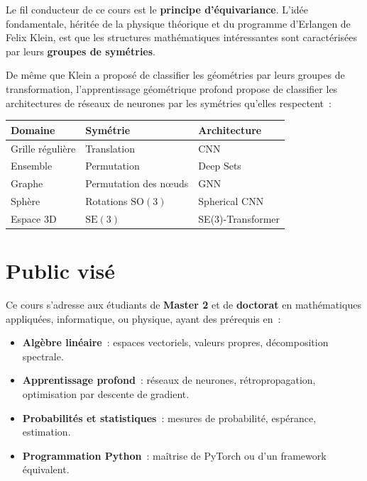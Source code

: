 Le fil conducteur de ce cours est le \textbf{principe d'\'equivariance}. L'id\'ee
fondamentale, h\'erit\'ee de la physique th\'eorique et du programme d'Erlangen de
Felix Klein, est que les structures math\'ematiques int\'eressantes sont caract\'eris\'ees
par leurs \textbf{groupes de sym\'etries}.

\begin{intuition}[title=\textbf{Le programme d'Erlangen pour le deep learning}]
De m\^eme que Klein a propos\'e de classifier les g\'eom\'etries par leurs groupes
de transformation, l'apprentissage g\'eom\'etrique profond propose de classifier
les architectures de r\'eseaux de neurones par les sym\'etries qu'elles respectent~:
\begin{center}
\begin{tabular}{lll}
\toprule
\textbf{Domaine} & \textbf{Sym\'etrie} & \textbf{Architecture} \\
\midrule
Grille r\'eguli\`ere & Translation & CNN \\
Ensemble & Permutation & Deep Sets \\
Graphe & Permutation des n\oe uds & GNN \\
Sph\`ere & Rotations $\mathrm{SO}(3)$ & Spherical CNN \\
Espace 3D & $\mathrm{SE}(3)$ & SE(3)-Transformer \\
\bottomrule
\end{tabular}
\end{center}
\end{intuition}

\section*{Public vis\'e}

Ce cours s'adresse aux \'etudiants de \textbf{Master 2} et de \textbf{doctorat} en
math\'ematiques appliqu\'ees, informatique, ou physique, ayant des pr\'erequis en~:
\begin{itemize}
    \item \textbf{Alg\`ebre lin\'eaire}~: espaces vectoriels, valeurs propres,
          d\'ecomposition spectrale.
    \item \textbf{Apprentissage profond}~: r\'eseaux de neurones, r\'etropropagation,
          optimisation par descente de gradient.
    \item \textbf{Probabilit\'es et statistiques}~: mesures de probabilit\'e,
          esp\'erance, estimation.
    \item \textbf{Programmation Python}~: ma\^itrise de PyTorch ou d'un framework
          \'equivalent.
\end{itemize}

